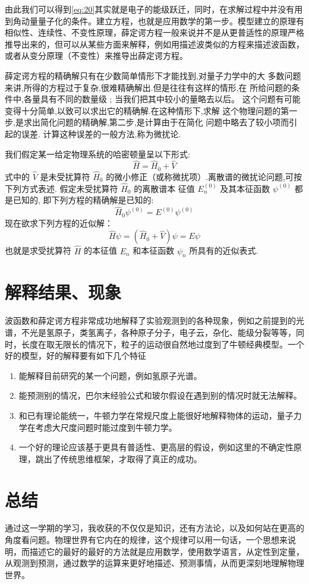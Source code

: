 \documentclass[12pt]{article}
\begin{document}
由此我们可以得到\cref{eq:20}其实就是电子的能级跃迁，同时，在求解过程中并没有用到角动量量子化的条件。建立方程，也就是应用数学的第一步。模型建立的原理有相似性、连续性、不变性原理，薛定谔方程一般来说并不是从更普适性的原理严格推导出来的，但可以从某些方面来解释，例如用描述波类似的方程来描述波函数，或者从变分原理（不变性）来推导出薛定谔方程。

薛定谔方程的精确解只有在少数简单情形下才能找到,对量子力学中的大 多数问题来讲,所得的方程过于复杂,很难精确解出.但是往往有这样的情形,在 所给问题的条件中,各量具有不同的数量级 ; 当我们把其中较小的量略去以后。 这个问题有可能变得十分简单,以致可以求出它的精确解.在这种情形下,求解 这个物理问题的第一步,是求出简化问题的精确解,第二步,是计算由于在简化 问题中略去了较小项而引起的误差. 计算这种误差的一般方法,称为微扰论.


我们假定某一给定物理系统的哈密顿量呈以下形式:
$$
\hat{H}=\hat{H}_{0}+\hat{V}
$$
式中的 $\hat{V}$ 是未受扰算符 $\hat{H}_{0}$ 的微小修正（或称微扰项）.离散谱的微扰论问题,可按下列方式表述. 假定未受扰算符 $\hat{H}_{0}$ 的离散谱本 征值 $E_{n}^{(0)}$ 及其本征函数 $\psi^{(0)}$ 都是已知的, 即下列方程的精确解是已知的:
$$
\hat{H}_{0} \psi^{(0)}=E^{(0)} \psi^{(0)}
$$
现在欲求下列方程的近似解：
$$
\hat{H} \psi=\left(\hat{H}_{0}+\hat{V}\right) \psi=E \psi
$$
也就是求受扰算符 $\hat{H}$ 的本征值 $E_{n}$ 和本征函数 $\psi_{n}$ 所具有的近似表式.

\section{解释结果、现象}

波函数和薛定谔方程非常成功地解释了实验观测到的各种现象，例如之前提到的光谱，不光是氢原子，类氢离子，各种原子分子，电子云，杂化、能级分裂等等，同时，长度在取无限长的情况下，粒子的运动很自然地过度到了牛顿经典模型。一个好的模型，好的解释要有如下几个特征
\begin{enumerate}
	\item 能解释目前研究的某一个问题，例如氢原子光谱。
	\item 能预测别的情况，巴尔末经验公式和玻尔假设在遇到别的情况时就无法解释。
	\item 和已有理论能统一，牛顿力学在常规尺度上能很好地解释物体的运动，量子力学在考虑大尺度问题时能过度到牛顿力学。
	\item 一个好的理论应该基于更具有普适性、更高层的假设，例如这里的不确定性原理，跳出了传统思维框架，才取得了真正的成功。
\end{enumerate}

\section{总结}

通过这一学期的学习，我收获的不仅仅是知识，还有方法论，以及如何站在更高的角度看问题。物理世界有它内在的规律，这个规律可以用一句话，一个思想来说明，而描述它的最好的最好的方法就是应用数学，使用数学语言，从定性到定量，从观测到预测，通过数学的运算来更好地描述、预测事情，从而更深刻地理解物理世界。



\nocite{*}


\end{document}
